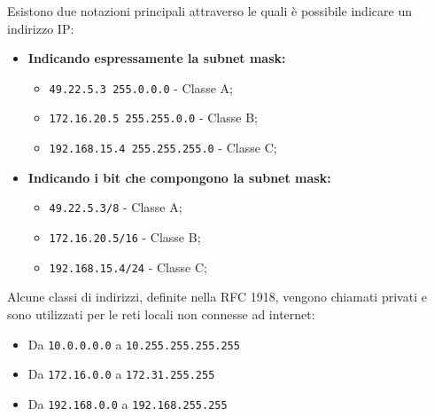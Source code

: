 \documentclass[a4paper]{report}
\begin{document}
Esistono due notazioni principali attraverso le quali è possibile indicare un indirizzo IP:
\begin{itemize}
\item \textbf{Indicando espressamente la subnet mask:}
	\begin{itemize}
	\item \texttt{49.22.5.3 255.0.0.0} - Classe A;
	\item \texttt{172.16.20.5 255.255.0.0} - Classe B;
	\item \texttt{192.168.15.4 255.255.255.0} - Classe C;
	\end{itemize}
\item \textbf{Indicando i bit che compongono la subnet mask:}
	\begin{itemize}
	\item \texttt{49.22.5.3/8} - Classe A;
	\item \texttt{172.16.20.5/16} - Classe B;
	\item \texttt{192.168.15.4/24} - Classe C;
	\end{itemize}
\end{itemize}
Alcune classi di indirizzi, definite nella RFC
1918, vengono chiamati privati e sono utilizzati
per le reti locali non connesse ad internet:
\begin{itemize}
\item Da \texttt{10.0.0.0.0} a \texttt{10.255.255.255.255}
\item Da \texttt{172.16.0.0} a \texttt{172.31.255.255}
\item Da \texttt{192.168.0.0} a \texttt{192.168.255.255}
\end{itemize}
\end{document}
